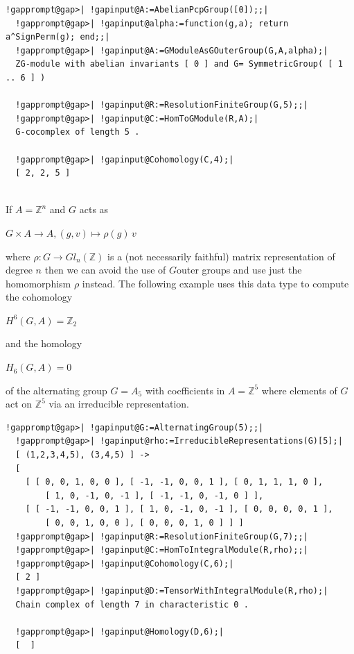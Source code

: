 \documentclass[a4paper,11pt]{report}
\begin{document}
{{\begin{Verbatim}[commandchars=!@|,fontsize=\small,frame=single,label=Example]
  !gapprompt@gap>| !gapinput@A:=AbelianPcpGroup([0]);;|
  !gapprompt@gap>| !gapinput@alpha:=function(g,a); return a^SignPerm(g); end;;|
  !gapprompt@gap>| !gapinput@A:=GModuleAsGOuterGroup(G,A,alpha);|
  ZG-module with abelian invariants [ 0 ] and G= SymmetricGroup( [ 1 .. 6 ] )
  
  !gapprompt@gap>| !gapinput@R:=ResolutionFiniteGroup(G,5);;|
  !gapprompt@gap>| !gapinput@C:=HomToGModule(R,A);|
  G-cocomplex of length 5 . 
  
  !gapprompt@gap>| !gapinput@Cohomology(C,4);|
  [ 2, 2, 5 ]
  
\end{Verbatim}
 

 If $A=\mathbb Z^n$ and $G$ acts as 

$G\times A \rightarrow A, (g, v) \mapsto \rho(g)\, v $ 

 where $\rho\colon G\rightarrow Gl_n(\mathbb Z)$ is a (not necessarily faithful) matrix representation of degree $n$ then we can avoid the use of $G$\texttt{}outer groups and use just the homomorphism $\rho$ instead. The following example uses this data type to compute the cohomology 

$H^6(G,A) =\mathbb Z_2 $ 

and the homology 

$H_6(G,A) = 0 $ 

 of the alternating group $G=A_5$ with coefficients in $A=\mathbb Z^5$ where elements of $G$ act on $\mathbb Z^5$ via an irreducible representation. 
\begin{Verbatim}[commandchars=!@|,fontsize=\small,frame=single,label=Example]
  !gapprompt@gap>| !gapinput@G:=AlternatingGroup(5);;|
  !gapprompt@gap>| !gapinput@rho:=IrreducibleRepresentations(G)[5];|
  [ (1,2,3,4,5), (3,4,5) ] -> 
  [ 
    [ [ 0, 0, 1, 0, 0 ], [ -1, -1, 0, 0, 1 ], [ 0, 1, 1, 1, 0 ], 
        [ 1, 0, -1, 0, -1 ], [ -1, -1, 0, -1, 0 ] ], 
    [ [ -1, -1, 0, 0, 1 ], [ 1, 0, -1, 0, -1 ], [ 0, 0, 0, 0, 1 ], 
        [ 0, 0, 1, 0, 0 ], [ 0, 0, 0, 1, 0 ] ] ]
  !gapprompt@gap>| !gapinput@R:=ResolutionFiniteGroup(G,7);;|
  !gapprompt@gap>| !gapinput@C:=HomToIntegralModule(R,rho);;|
  !gapprompt@gap>| !gapinput@Cohomology(C,6);|
  [ 2 ]
  !gapprompt@gap>| !gapinput@D:=TensorWithIntegralModule(R,rho);|
  Chain complex of length 7 in characteristic 0 . 
  
  !gapprompt@gap>| !gapinput@Homology(D,6);|
  [  ]
  
\end{Verbatim}
 

}}
\end{document}
